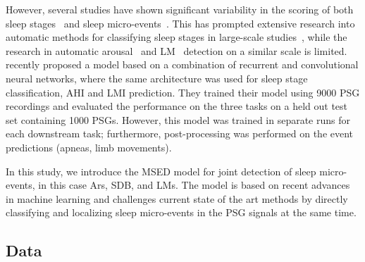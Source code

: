 However, several studies have shown significant variability in the scoring of both sleep stages~\cite{Norman2000, Danker-Hopfe2004, Danker-Hopfe2009, Rosenberg2013, Zhang2015a, Younes2016, Younes2018} and sleep micro-events~\cite{Drinnan1998, Whitney1998, Loredo1999, Smurra2001, Thomas2003, Bonnet2007, Magalang2013, Rosenberg2014}.
This has prompted extensive research into automatic methods for classifying sleep stages in large-scale studies~\cite{Koch2014, Supratak2017, Chambon2018c, Olesen2018c, Biswal2018, Stephansen2018, Phan2019a, Phan2019b}, while the research in automatic arousal~\cite{Olesen2019, Alvarez-Estevez2019, Brink-Kjaer2020} and \ac{LM}~\cite{Carvelli2020} detection on a similar scale is limited.
\citeauthor{Biswal2018} recently proposed a model based on a combination of recurrent and convolutional neural networks, where the same architecture was used for sleep stage classification, \ac{AHI} and \ac{LMI} prediction.
They trained their model using \num{9000} \ac{PSG} recordings and evaluated the performance on the three tasks on a held out test set containing \num{1000} \acp{PSG}. 
However, this model was trained in separate runs for each downstream task; furthermore, post-processing was performed on the event predictions (apneas, limb movements).

In this study, we introduce the \ac{MSED} model for joint detection of sleep micro-events, in this case \acp{Ar}, \ac{SDB}, and \acp{LM}.
The model is based on recent advances in machine learning and challenges current state of the art methods by directly classifying and localizing sleep micro-events in the \ac{PSG} signals at the same time.

\subsection{Data}

